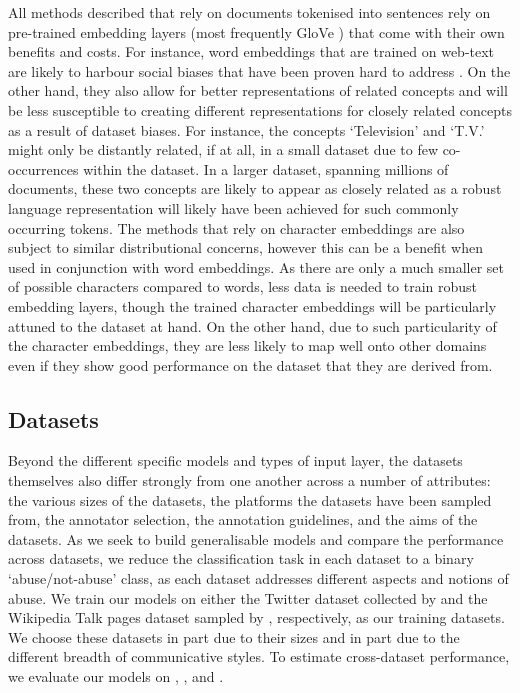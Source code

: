 All methods described that rely on documents tokenised into sentences rely on pre-trained embedding layers (most frequently GloVe \citet{Pennington:2014}) that come with their own benefits and costs. For instance, word embeddings that are trained on web-text are likely to harbour social biases \citep{Bolukbasi:2016} that have been proven hard to address \citep{Gonen:2019}. On the other hand, they also allow for better representations of related concepts and will be less susceptible to creating different representations for closely related concepts as a result of dataset biases. For instance, the concepts `Television' and `T.V.' might only be distantly related, if at all, in a small dataset due to few co-occurrences within the dataset. In a larger dataset, spanning millions of documents, these two concepts are likely to appear as closely related as a robust language representation will likely have been achieved for such commonly occurring tokens.
The methods that rely on character embeddings are also subject to similar distributional concerns, however this can be a benefit when used in conjunction with word embeddings. As there are only a much smaller set of possible characters compared to words, less data is needed to train robust embedding layers, though the trained character embeddings will be particularly attuned to the dataset at hand. On the other hand, due to such particularity of the character embeddings, they are less likely to map well onto other domains even if they show good performance on the dataset that they are derived from.\vspace{5mm}





\subsection{Datasets}
Beyond the different specific models and types of input layer, the datasets themselves also differ strongly from one another across a number of attributes: the various sizes of the datasets, the platforms the datasets have been sampled from, the annotator selection, the annotation guidelines, and the aims of the datasets. As we seek to build generalisable models and compare the performance across datasets, we reduce the classification task in each dataset to a binary `abuse/not-abuse' class, as each dataset addresses different aspects and notions of abuse.
We train our models on either the Twitter dataset collected by \citet{Davidson:2017} and the Wikipedia Talk pages dataset sampled by \citet{Wulczyn:2016}, respectively, as our training datasets. We choose these datasets in part due to their sizes and in part due to the different breadth of communicative styles. To estimate cross-dataset performance, we evaluate our models on \citet{Waseem-Hovy:2016}, \citet{Waseem:2016}, and \citet{Garcia:2019}.

